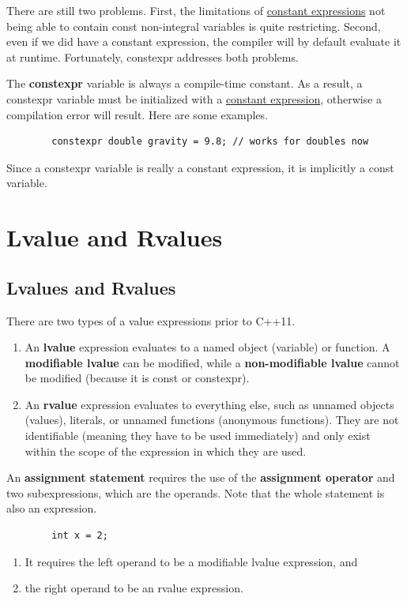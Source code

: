\documentclass{article}
\newcounter{definition}[section]
\newcounter{example}[section]
\begin{document}
    There are still two problems. First, the limitations of \hyperref[def:constant-expression]{constant expressions} not being able to contain const non-integral variables is quite restricting. Second, even if we did have a constant expression, the compiler will by default evaluate it at runtime. Fortunately, constexpr addresses both problems. 

    \begin{definition}
      \label{def:constexpr-keyword}
      The \textbf{constexpr} variable is always a compile-time constant. As a result, a constexpr variable must be initialized with a \hyperref[def:constant-expression]{constant expression}, otherwise a compilation error will result. Here are some examples. 
      \begin{lstlisting}
        constexpr double gravity = 9.8; // works for doubles now 
      \end{lstlisting} 
      Since a constexpr variable is really a constant expression, it is implicitly a const variable. 
    \end{definition} 

\section{Lvalue and Rvalues} 

  \subsection{Lvalues and Rvalues}
  
    There are two types of a value expressions prior to C++11. 
    \begin{enumerate}
      \item An \textbf{lvalue} expression evaluates to a named object (variable) or function. A \textbf{modifiable lvalue} can be modified, while a \textbf{non-modifiable lvalue} cannot be modified (because it is const or constexpr). 
      \item An \textbf{rvalue} expression evaluates to everything else, such as unnamed objects (values), literals, or unnamed functions (anonymous functions). They are not identifiable (meaning they have to be used immediately) and only exist within the scope of the expression in which they are used. 
    \end{enumerate}

    \begin{example}
      \label{ex:assignment-statement}
      An \textbf{assignment statement} requires the use of the \textbf{assignment operator} and two subexpressions, which are the operands. Note that the whole statement is also an expression. 
      \begin{lstlisting}
        int x = 2; 
      \end{lstlisting}
      \begin{enumerate}
        \item It requires the left operand to be a modifiable lvalue expression, and
        \item the right operand to be an rvalue expression. 
      \end{enumerate}
    \end{example} 
\end{document}
